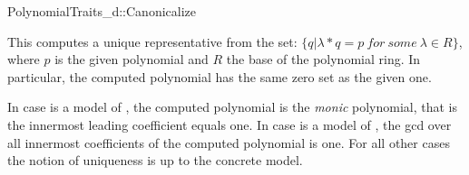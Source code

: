 \begin{ccRefConcept}{PolynomialTraits_d::Canonicalize}

\ccDefinition

This  computes a unique representative from the set: 
$\{ q | \lambda * q = p\ for\ some\ \lambda \in R  \}$, 
where $p$ is the given polynomial and $R$ the base of the polynomial ring. 
In particular, the computed polynomial has the same zero set as the given one.

In case  is a model of , 
the computed polynomial is the {\em monic} polynomial, 
that is the innermost leading coefficient equals one.
In case  is a model 
of , the gcd over all innermost coefficients of 
the computed polynomial is one.
For all other cases the notion of uniqueness is up to the concrete model. 



\ccRefines 


\ccTypes


\ccGlue
{}

\ccOperations





\ccSeeAlso

\\
\\

\end{ccRefConcept}